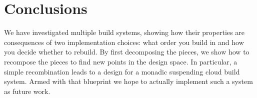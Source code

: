 \section{Conclusions}\label{sec-conclusions}

We have investigated multiple build systems, showing how their properties are consequences of two implementation choices: what order you build in and how you decide whether to rebuild. By first decomposing the pieces, we show how to recompose the pieces to find new points in the design space. In particular, a simple recombination leads to a design for a monadic suspending cloud build system. Armed with that blueprint we hope to actually implement such a system as future work.
